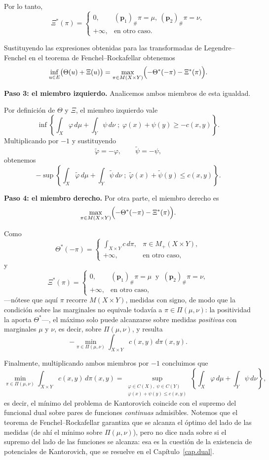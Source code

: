 \documentclass[12pt, a4paper]{amsbook}
\newcommand{\pp}{{\mathbf p}}
\theoremstyle{remark}
\theoremstyle{definition}
\numberwithin{section}{chapter}
\numberwithin{subsection}{section}
\numberwithin{equation}{section}
\numberwithin{figure}{chapter}
\begin{document}
Por lo tanto,
\[
\Xi^*(\pi)
=
\begin{cases}
0,
&
(\pp_1)_\#\pi=\mu,\ (\pp_2)_\#\pi=\nu,
\\
+\infty,
&
\text{en otro caso}.
\end{cases}
\]

Sustituyendo las expresiones obtenidas para las transformadas de
Legendre--Fenchel en el teorema de Fenchel--Rockafellar obtenemos
\[
\inf_{u\in E}
\bigl(
\Theta(u)+\Xi(u)
\bigr)
=
\max_{\pi\in M(X\times Y)}
\Bigl(
-\Theta^*(-\pi)
-
\Xi^*(\pi)
\Bigr).
\]

\medskip\noindent\textbf{Paso 3: el miembro izquierdo.}
Analicemos ambos miembros de esta igualdad.

Por definición de $\Theta$ y $\Xi$, el miembro izquierdo vale
\[
\inf
\left\{
\int_X\varphi\,d\mu
+
\int_Y\psi\,d\nu
\; ; \;
\varphi(x)+\psi(y)\ge -c(x,y)
\right\}.
\]
Multiplicando por $-1$ y sustituyendo
\[
\widetilde\varphi=-\varphi,
\qquad
\widetilde\psi=-\psi,
\]
obtenemos
\[
-\sup
\left\{
\int_X\widetilde\varphi\,d\mu
+
\int_Y\widetilde\psi\,d\nu
\; ; \;
\widetilde\varphi(x)+\widetilde\psi(y)
\le
c(x,y)
\right\}.
\]

\medskip\noindent\textbf{Paso 4: el miembro derecho.}
Por otra parte, el miembro derecho es
\[
\max_{\pi\in M(X\times Y)}
\Bigl(
-\Theta^*(-\pi)
-
\Xi^*(\pi)
\Bigr).
\]

Como
\[
\Theta^*(-\pi)
=
\begin{cases}
\displaystyle
\int_{X\times Y}c\,d\pi,
&
\pi\in M_+(X\times Y),
\\
+\infty,
&
\text{en otro caso},
\end{cases}
\]
y
\[
\Xi^*(\pi)
=
\begin{cases}
0,
&
(\pp_1)_\#\pi=\mu\ \text{ y }\ (\pp_2)_\#\pi=\nu,
\\
+\infty,
&
\text{en otro caso},
\end{cases}
\]
—nótese que aquí $\pi$ recorre $M(X\times Y)$, medidas con signo, de modo que
la condición sobre las marginales no equivale todavía a
$\pi\in\Pi(\mu,\nu)$: la positividad la aporta $\Theta^*$—, el máximo solo
puede alcanzarse sobre medidas \emph{positivas} con marginales $\mu$ y $\nu$,
es decir, sobre $\Pi(\mu,\nu)$, y resulta
\[
-\min_{\pi\in\Pi(\mu,\nu)}
\int_{X\times Y}
c(x,y)\,d\pi(x,y).
\]

Finalmente, multiplicando ambos miembros por $-1$ concluimos que
\[
\min_{\pi\in\Pi(\mu,\nu)}
\int_{X\times Y}
c(x,y)\,d\pi(x,y)
=
\sup_{\substack{
\varphi\in C(X),\;
\psi\in C(Y)\\
\varphi(x)+\psi(y)\le c(x,y)
}}
\left\{
\int_X\varphi\,d\mu
+
\int_Y\psi\,d\nu
\right\},
\]
es decir, el mínimo del problema de Kantorovich coincide con el supremo del
funcional dual sobre pares de funciones \emph{continuas} admisibles. Notemos
que el teorema de Fenchel--Rockafellar garantiza que se alcanza el óptimo del
lado de las medidas (de ahí el mínimo sobre $\Pi(\mu,\nu)$), pero no dice
nada sobre si el supremo del lado de las funciones se alcanza: esa es la
cuestión de la existencia de potenciales de Kantorovich, que se resuelve en
el Capítulo~\ref{cap.dual}.
\end{document}
